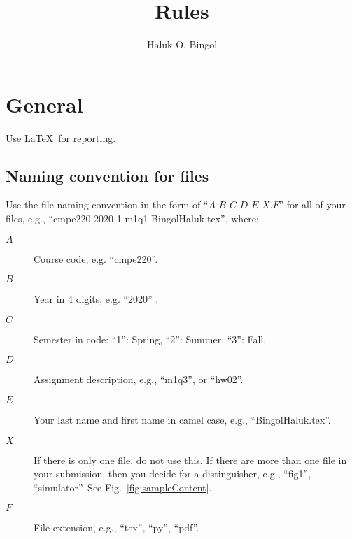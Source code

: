 \documentclass[11pt,a4,twocolumn]{article}
\title{
	Rules
}
\author{Haluk O. Bingol}
\date{\hbTimeStamp}
\newcommand{\reffig}[1]{Fig.~\ref{#1}}
\theoremstyle{plain}
\theoremstyle{definition}
\theoremstyle{remark}
\begin{document}
\maketitle








\section{General}

Use \LaTeX\ for reporting.




\subsection{Naming convention for files}

Use the file naming convention in the form of ``$A$-$B$-$C$-$D$-$E$-$X$.$F$'' for all of your files,
e.g., ``cmpe220-2020-1-m1q1-BingolHaluk.tex'',
where:
\begin{description}
	
	\item[$A$]
	Course code, 
	e.g. ``cmpe220''.
	
	\item[$B$]
	Year in 4 digits, 
	e.g. ``2020'' .
	
	\item[$C$] 
	Semester in code: ``1'': Spring, ``2'': Summer, ``3'': Fall.
	
	\item[$D$] 
	Assignment description, 
	e.g., ``m1q3'', or ``hw02''.
	
	\item[$E$]
	Your last name and first name in camel case,
	e.g., ``BingolHaluk.tex''.
	
	\item[$X$]
	If there is only one file, do not use this.
	If there are more than one file in your submission, 
	then you decide for a distinguisher,
	e.g., ``fig1'', ``simulator''.
	See \reffig{fig:sampleContent}.
	
	\item[$F$]
	File extension, 
	e.g., ``tex'', ``py'', ``pdf''.
\end{description}
\end{document}
